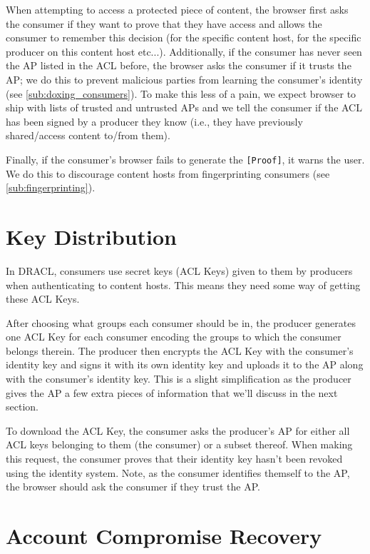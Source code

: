 \documentclass[pdftex,12pt,a4papaer,twoside,notitlepage]{report}
\begin{document}
When attempting to access a protected piece of content, the browser first asks
the consumer if they want to prove that they have access and allows the consumer
to remember this decision (for the specific content host, for the specific
producer on this content host etc...). Additionally, if the consumer has never
seen the AP listed in the ACL before, the browser asks the consumer if it trusts
the AP; we do this to prevent malicious parties from learning the consumer's
identity (see \ref{sub:doxing_consumers}). To make this less of a pain, we
expect browser to ship with lists of trusted and untrusted APs and we tell the
consumer if the ACL has been signed by a producer they know (i.e., they have
previously shared/access content to/from them).

Finally, if the consumer's browser fails to generate the \verb=[Proof]=, it
warns the user. We do this to discourage content hosts from fingerprinting
consumers (see \ref{sub:fingerprinting}).

\section{Key Distribution}

In DRACL, consumers use secret keys (ACL Keys) given to them by producers when
authenticating to content hosts. This means they need some way of getting these
ACL Keys.

After choosing what groups each consumer should be in, the producer generates
one ACL Key for each consumer encoding the groups to which the consumer belongs
therein. The producer then encrypts the ACL Key with the consumer's identity key
and signs it with its own identity key and uploads it to the AP along with the
consumer's identity key. This is a slight simplification as the producer gives
the AP a few extra pieces of information that we'll discuss in the next section.

To download the ACL Key, the consumer asks the producer's AP for either all ACL
keys belonging to them (the consumer) or a subset thereof. When making this
request, the consumer proves that their identity key hasn't been revoked using
the identity system. Note, as the consumer identifies themself to the AP, the
browser should ask the consumer if they trust the AP.

\section{Account Compromise Recovery}
\label{sec:revoke}
\end{document}
